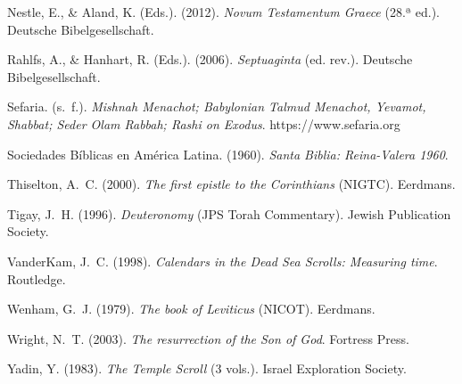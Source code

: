 \documentclass[11pt,letterpaper]{article}
\newcommand{\refapa}[1]{\par{\RaggedRight\hangindent=1.27cm\hangafter=1\noindent #1\par}\vspace{4pt}}
\begin{document}
\refapa{Nestle, E., \& Aland, K. (Eds.). (2012). \emph{Novum Testamentum Graece} (28.ª ed.). Deutsche Bibelgesellschaft.}
\refapa{Rahlfs, A., \& Hanhart, R. (Eds.). (2006). \emph{Septuaginta} (ed. rev.). Deutsche Bibelgesellschaft.}
\refapa{Sefaria. (s.~f.). \emph{Mishnah Menachot; Babylonian Talmud Menachot, Yevamot, Shabbat; Seder Olam Rabbah; Rashi on Exodus}. https://www.sefaria.org}
\refapa{Sociedades Bíblicas en América Latina. (1960). \emph{Santa Biblia: Reina-Valera 1960}.}
\refapa{Thiselton, A.~C. (2000). \emph{The first epistle to the Corinthians} (NIGTC). Eerdmans.}
\refapa{Tigay, J.~H. (1996). \emph{Deuteronomy} (JPS Torah Commentary). Jewish Publication Society.}
\refapa{VanderKam, J.~C. (1998). \emph{Calendars in the Dead Sea Scrolls: Measuring time}. Routledge.}
\refapa{Wenham, G.~J. (1979). \emph{The book of Leviticus} (NICOT). Eerdmans.}
\refapa{Wright, N.~T. (2003). \emph{The resurrection of the Son of God}. Fortress Press.}
\refapa{Yadin, Y. (1983). \emph{The Temple Scroll} (3 vols.). Israel Exploration Society.}
\end{document}
